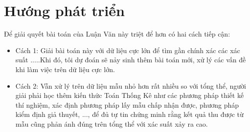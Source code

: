 \documentclass[a4paper, 13pt]{report}
\begin{document}
\section{Hướng phát triển}
Để giải quyết bài toán của Luận Văn này triệt để hơn có hai cách tiếp cận:
\begin{itemize}
\item Cách 1: Giải bài toán này với dữ liệu cực lớn để tìm gần chính xác các xác suất .....Khi đó, tôi dự đoán sẽ nảy sinh thêm bài toán mới, xử lý các vấn đề khi làm việc trên dữ liệu cực lớn.
\item Cách 2: Vẫn xử lý trên dữ liệu mẫu nhỏ hơn rất nhiều so với tổng thể, người giải phải học thêm kiến thức Toán Thống Kê như các phương pháp thiết kế thí nghiệm, xác định phương pháp lấy mẫu chấp nhận được, phương pháp kiểm định giả thuyết, ..., để đủ tự tin chứng minh rằng kết quả thu được từ mẫu cũng phản ánh đúng trên tổng thể với xác suất xảy ra cao.
\end{itemize}
\pagebreak
\end{document}
